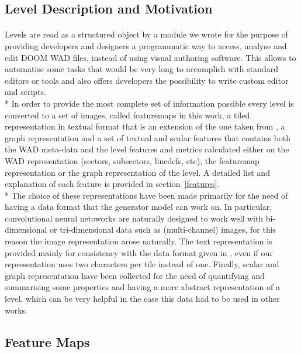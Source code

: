 \subsection{Level Description and Motivation}
\paragraph{}Levels are read as a structured object by a module we wrote for the purpose of providing developers and designers a programmatic way to access, analyse and edit DOOM WAD files, instead of using visual authoring software. This allows to automatise some tasks that would be very long to accomplish with standard editors or tools and also offers developers the possibility to write custom editor and scripts. \\*
In order to provide the most complete set of information possible every level is converted to a set of images, called \glspl{featuremap} in this work, a tiled representation in textual format that is an extension of the one taken from \cite{VGLC}, a graph representation and a set of textual and scalar features that contains both the \gls{WAD} meta-data and the level features and metrics calculated either on the WAD representation (sectors, subsectors, linedefs, etc), the \gls{featuremap} representation or the graph representation of the level. A detailed list and explanation of each feature is provided in section~\ref{features}. \\*
The choice of these representations have been made primarily for the need of having a data format that the generator model can work  on. In particular, convolutional neural netoworks are naturally designed to work well with bi-dimensional or tri-dimensional data such as (multi-channel) images, for this reason the image representation arose naturally. The text representation is provided mainly for consistency with the data format given in \cite{VGLC}, even if our representation uses two characters per tile instead of one. Finally, scalar and graph representation have been collected for the need of quantifying and summarising some properties and having a more abstract representation of a level, which can be very helpful in the case this data had to be used in other works.

\subsection{Feature Maps}

